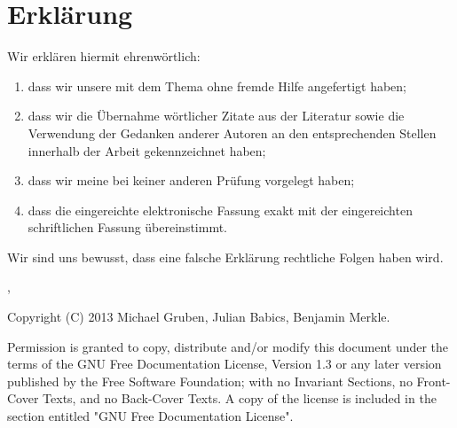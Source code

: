 \thispagestyle{empty}

\section*{Erklärung}
\vspace*{2em}

Wir erklären hiermit ehrenwörtlich: \\
\begin{enumerate}
\item dass wir unsere {\arbeitsart} mit dem Thema
{\itshape \titel } ohne fremde Hilfe angefertigt haben;
\item dass wir die Übernahme wörtlicher Zitate aus der Literatur sowie die
Verwendung der Gedanken anderer Autoren an den entsprechenden Stellen innerhalb
der Arbeit gekennzeichnet haben;
\item dass wir meine {\arbeitsart} bei keiner anderen Prüfung vorgelegt haben;
\item dass die eingereichte elektronische Fassung exakt mit der eingereichten schriftlichen Fassung
übereinstimmt.
\end{enumerate}

Wir sind uns bewusst, dass eine falsche Erklärung rechtliche Folgen haben wird.

\vspace{3em}

\abgabeort, \datumAbgabe
\vspace{4em}

\autor \newpage Copyright (C)  2013  Michael Gruben, Julian Babics, Benjamin
Merkle.

Permission is granted to copy, distribute and/or modify this document under the
terms of the GNU Free Documentation License, Version 1.3 or any later version
published by the Free Software Foundation; with no Invariant Sections, no
Front-Cover Texts, and no Back-Cover Texts. A copy of the license is included in
the section entitled "GNU Free Documentation License".